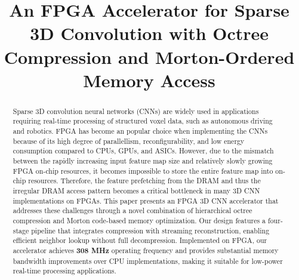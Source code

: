\documentclass[sigconf, screen]{acmart}
\begin{document}
\renewcommand\footnotetextcopyrightpermission[1]{} 
\pagestyle{plain}

\title{An FPGA Accelerator for Sparse 3D Convolution with Octree Compression and Morton-Ordered Memory Access}




\begin{abstract}
Sparse 3D convolution neural networks (CNNs) are widely used in applications requiring real-time processing of structured voxel data, such as autonomous driving and robotics. FPGA has become an popular choice when implementing the CNNs because of its high degree of parallellism, reconfigurability, and low energy consumption compared to CPUs, GPUs, and ASICs. However, due to the mismatch between the rapidly increasing input feature map size and relatively slowly growing FPGA on-chip resources, it becomes impossible to store the entire feature map into on-chip resources. Therefore, the feature prefetching from the DRAM and thus the irregular DRAM access pattern becomes a critical bottleneck in many 3D CNN implementations on FPGAs. This paper presents an FPGA 3D CNN accelerator that addresses these challenges through a novel combination of hierarchical octree compression and Morton code-based memory optimization. Our design features a four-stage pipeline that integrates compression with streaming reconstruction, enabling efficient neighbor lookup without full decompression. Implemented on FPGA, our accelerator achieves \textbf{308 MHz} operating frequency and provides substantial memory bandwidth improvements over CPU implementations, making it suitable for low-power real-time processing applications.
\end{abstract}

\end{document}
